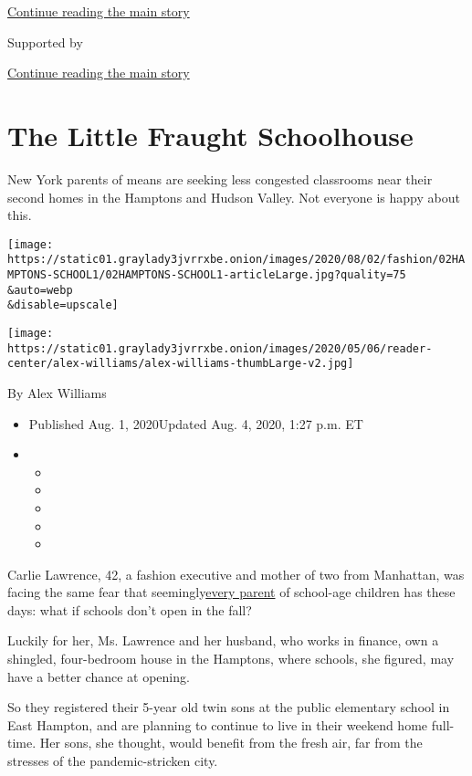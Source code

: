 \protect\hyperlink{after-top}{Continue reading the main story}

Supported by

\protect\hyperlink{after-sponsor}{Continue reading the main story}

\hypertarget{the-little-fraught-schoolhouse}{%
\section{The Little Fraught
Schoolhouse}\label{the-little-fraught-schoolhouse}}

New York parents of means are seeking less congested classrooms near
their second homes in the Hamptons and Hudson Valley. Not everyone is
happy about this.

\texttt{[image: https://static01.graylady3jvrrxbe.onion/images/2020/08/02/fashion/02HAMPTONS-SCHOOL1/02HAMPTONS-SCHOOL1-articleLarge.jpg?quality=75\\\&auto=webp\\\&disable=upscale]}

\texttt{[image: https://static01.graylady3jvrrxbe.onion/images/2020/05/06/reader-center/alex-williams/alex-williams-thumbLarge-v2.jpg]}

By Alex Williams

\begin{itemize}
\item
  Published Aug. 1, 2020Updated Aug. 4, 2020, 1:27 p.m. ET
\item
  \begin{itemize}
  \item
  \item
  \item
  \item
  \item
  \end{itemize}
\end{itemize}

Carlie Lawrence, 42, a fashion executive and mother of two from
Manhattan, was facing the same fear that
seemingly\href{https://www.nytimes3xbfgragh.onion/2020/07/30/nyregion/pod-schools-hastings-on-hudson.html}{every
parent} of school-age children has these days: what if schools don't
open in the fall?

Luckily for her, Ms. Lawrence and her husband, who works in finance, own
a shingled, four-bedroom house in the Hamptons, where schools, she
figured, may have a better chance at opening.

So they registered their 5-year old twin sons at the public elementary
school in East Hampton, and are planning to continue to live in their
weekend home full-time. Her sons, she thought, would benefit from the
fresh air, far from the stresses of the pandemic-stricken city.

